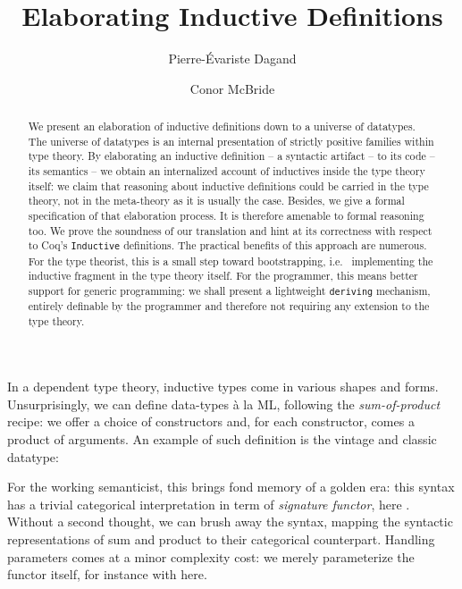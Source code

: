\documentclass{scrartcl}
\title{Elaborating Inductive Definitions}
\author{Pierre-\'{E}variste Dagand \and Conor McBride}
\date{}
\theoremstyle{plain}
\theoremstyle{definition}
\newcommand{\ie}{i.e.\ }
\begin{document}
\maketitle



\begin{abstract}






We present an elaboration of inductive definitions down to a universe
of datatypes. The universe of datatypes is an internal presentation of
strictly positive families within type theory. By elaborating an
inductive definition -- a syntactic artifact -- to its code -- its
semantics -- we obtain an internalized account of inductives inside
the type theory itself: we claim that reasoning about inductive
definitions could be carried in the type theory, not in the
meta-theory as it is usually the case. Besides, we give a formal
specification of that elaboration process. It is therefore amenable to
formal reasoning too. We prove the soundness of our translation and
hint at its correctness with respect to Coq's \texttt{Inductive}
definitions. The practical benefits of this approach are numerous. For
the type theorist, this is a small step toward bootstrapping, \ie
implementing the inductive fragment in the type theory itself. For the
programmer, this means better support for generic programming: we
shall present a lightweight \texttt{deriving} mechanism, entirely
definable by the programmer and therefore not requiring any extension
to the type theory.

\end{abstract}



In a dependent type theory, inductive types come in various shapes and
forms. Unsurprisingly, we can define data-types \`{a} la ML,
following the \emph{sum-of-product} recipe: we offer a choice of
constructors and, for each constructor, comes a product of
arguments. An example of such definition is the vintage and classic
 datatype:

For the working semanticist, this brings fond memory of a golden era:
this syntax has a trivial categorical interpretation in term of
\emph{signature functor}, here . Without a
second thought, we can brush away the syntax, mapping the syntactic
representations of sum and product to their categorical
counterpart. Handling parameters comes at a minor complexity cost: we
merely parameterize the functor itself, for instance with  here.
\end{document}
